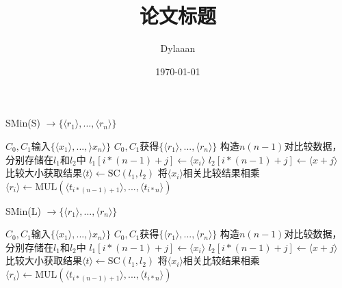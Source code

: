 \documentclass[12pt, a4paper, oneside]{ctexart}
\title{\textbf{论文标题}}
\author{Dylaaan}
\date{\today}
\begin{document}
\maketitle

\setcounter{page}{0}
\maketitle
\thispagestyle{empty}

\begin{algorithm}[htbp]
	\renewcommand{\algorithmicrequire}{\textbf{输入:}}
	\renewcommand{\algorithmicensure}{\textbf{输出:}}
	\caption{SMin(S) $\rightarrow \{\langle r_1 \rangle,...,\langle r_n\rangle\}$}
	\label{alg_sc}
	\begin{algorithmic}[1]
		\REQUIRE $C_0,C_1$输入$ \{\langle x_1 \rangle,...,\rangle x_n\rangle\} $
		\ENSURE $C_0,C_1$获得$\{\langle r_1 \rangle,...,\langle r_n\rangle\}$
		\STATE 构造$ n(n-1) $对比较数据，分别存储在$ l_1 $和$ l_2 $中
		\STATE $ l_1[i*(n-1)+j] \leftarrow \langle x_i \rangle $
		\STATE $ l_2[i*(n-1)+j] \leftarrow \langle x+j \rangle $
		\ENDFOR
		\ENDFOR
		\STATE 比较大小获取结果$ \langle t \rangle \leftarrow \text{SC}(l_1, l_2) $
		\STATE 将$ \langle x_i\rangle $相关比较结果相乘$ \langle r_i \rangle \leftarrow \text{MUL}(\langle t_{i*(n-1)+1}\rangle,...,\langle t_{i*n} \rangle)$
		\ENDFOR
	\end{algorithmic}
\end{algorithm}

\begin{algorithm}[htbp]
	\renewcommand{\algorithmicrequire}{\textbf{输入:}}
	\renewcommand{\algorithmicensure}{\textbf{输出:}}
	\caption{SMin(L) $\rightarrow \{\langle r_1  \rangle,...,\langle r_n\rangle\}$}
	\label{alg_sminl}
	\begin{algorithmic}[1]
		\REQUIRE $C_0,C_1$输入$ \{\langle x_1 \rangle,...,\rangle x_n\rangle\} $
		\ENSURE $C_0,C_1$获得$\{\langle r_1 \rangle,...,\langle r_n\rangle\}$
		\STATE 
		\ENDFOR
		\STATE 构造$ n(n-1) $对比较数据，分别存储在$ l_1 $和$ l_2 $中
		\STATE $ l_1[i*(n-1)+j] \leftarrow \langle x_i \rangle $
		\STATE $ l_2[i*(n-1)+j] \leftarrow \langle x+j \rangle $
		\ENDFOR
		\ENDFOR
		\STATE 比较大小获取结果$ \langle t \rangle \leftarrow \text{SC}(l_1, l_2) $
		\STATE 将$ \langle x_i\rangle $相关比较结果相乘$ \langle r_i \rangle \leftarrow \text{MUL}(\langle t_{i*(n-1)+1}\rangle,...,\langle t_{i*n} \rangle)$
		\ENDFOR
	\end{algorithmic}
\end{algorithm}
\end{document}

